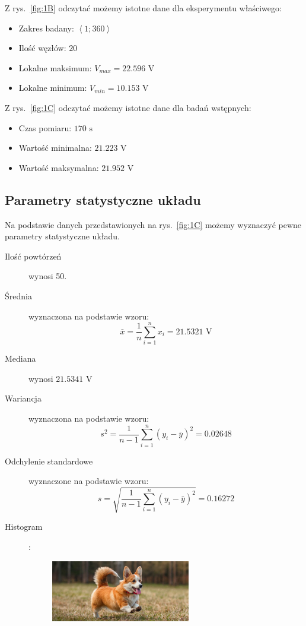 \documentclass[a4paper, 12pt]{mwart}
\begin{document}
	\newpage
			Z rys.~\ref{fig:1B} odczytać możemy istotne dane dla eksperymentu właściwego:
			\begin{itemize}
				\item Zakres badany: $\left< 1;360 \right>$
				\item Ilość węzłów: $20$
				\item Lokalne maksimum: $V_{max} = 22.596 \text{ V}$
				\item Lokalne minimum: $V_{min} = 10.153 \text{ V}$
			\end{itemize}

			Z rys.~\ref{fig:1C} odczytać możemy istotne dane dla badań wstępnych:
			\begin{itemize}
				\item Czas pomiaru: $170 \text{ s}$
				\item Wartość minimalna: $21.223 \text{ V}$
				\item Wartość maksymalna: $21.952 \text{ V}$
			\end{itemize}

		\subsection{Parametry statystyczne układu}
			
			Na podstawie danych przedstawionych na rys.~\ref{fig:1C} możemy wyznaczyć pewne parametry statystyczne
			układu.

			\begin{description}
				\item[Ilość powtórzeń] wynosi 50.
				\item[Średnia] wyznaczona na podstawie wzoru:
					$$ \bar{x} = \frac{1}{n} \sum_{i=1}^n x_i =  21.5321 \text{ V}$$
				\item[Mediana] wynosi $21.5341 \text{ V}$
				\item[Wariancja] wyznaczona na podstawie wzoru:
					$$ s^2 = \frac{1}{n - 1} \sum_{i=1}^n (y_i - \bar{y})^2 = 0.02648$$
				\item[Odchylenie standardowe] wyznaczone na podstawie wzoru:
					$$ s = \sqrt{\frac{1}{n - 1} \sum_{i=1}^n (y_i - \bar{y})^2} = 0.16272$$
				\item[Histogram]:
					\begin{figure}[h]
						\begin{center}
							\includegraphics[width = 0.6\textwidth]{pictures/ratgeber_hund_rasse_portraits_welsh-corgi-pembroke_1200x527.jpg}
						\end{center}
					\end{figure}
			\end{description}
\end{document}
